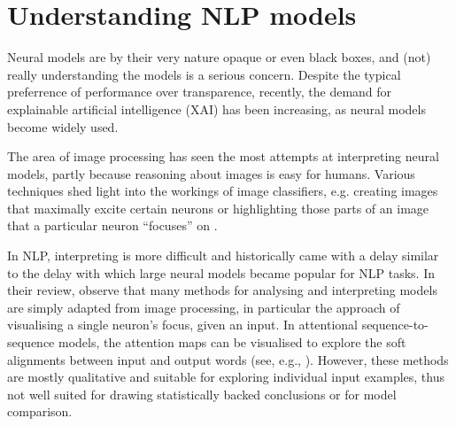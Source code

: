 \documentclass[bsc,frontabs,twoside,singlespacing,parskip,deptreport]{infthesis}
\begin{document}
{  \section{Understanding NLP models}{
    Neural models are by their very nature opaque or even black boxes, and (not) really understanding the models is a serious concern.
    Despite the typical preferrence of performance over transparence, recently, the demand for explainable artificial intelligence (XAI) has been increasing, as neural models become widely used.

    The area of image processing has seen the most attempts at interpreting neural models, partly because reasoning about images is easy for humans. Various techniques shed light into the workings of image classifiers, e.g. creating images that maximally excite certain neurons \citep{Simonyan_2013} or highlighting those parts of an image that a particular neuron ``focuses'' on \citep{Zeiler_2013}. 
    
    In NLP, interpreting is more difficult and historically came with a delay similar to the delay with which large neural models became popular for NLP tasks.
    In their review, \citet{Belinkov_2018} observe that many methods for analysing and interpreting models are simply adapted from image processing, in particular the approach of visualising a single neuron's focus, given an input.
    In attentional sequence-to-sequence models, the attention maps can be visualised to explore the soft alignments between input and output words (see, e.g., \citet{Strobelt_2018}). However, these methods are mostly qualitative and suitable for exploring individual input examples, thus not well suited for drawing statistically backed conclusions or for model comparison.
    
}}
\end{document}

